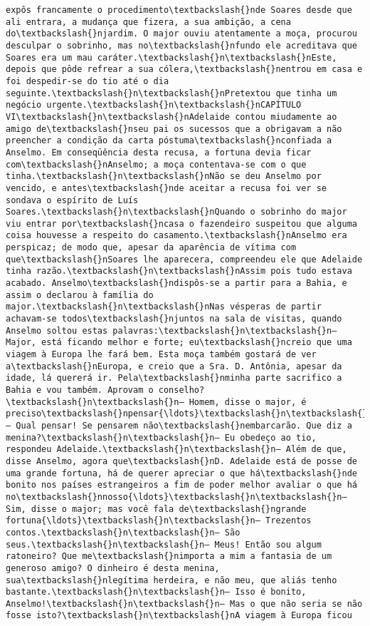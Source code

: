 \documentclass[11pt]{article}
\begin{document}
\begin{Verbatim}[commandchars=\\\{\}]
expôs francamente o procedimento\textbackslash{}nde Soares desde que ali entrara, a mudança que fizera, a sua ambição, a cena do\textbackslash{}njardim. O major ouviu atentamente a moça, procurou desculpar o sobrinho, mas no\textbackslash{}nfundo ele acreditava que Soares era um mau caráter.\textbackslash{}n\textbackslash{}nEste, depois que pôde refrear a sua cólera,\textbackslash{}nentrou em casa e foi despedir-se do tio até o dia seguinte.\textbackslash{}n\textbackslash{}nPretextou que tinha um negócio urgente.\textbackslash{}n\textbackslash{}nCAPÍTULO VI\textbackslash{}n\textbackslash{}nAdelaide contou miudamente ao amigo de\textbackslash{}nseu pai os sucessos que a obrigavam a não preencher a condição da carta póstuma\textbackslash{}nconfiada a Anselmo. Em conseqüência desta recusa, a fortuna devia ficar com\textbackslash{}nAnselmo; a moça contentava-se com o que tinha.\textbackslash{}n\textbackslash{}nNão se deu Anselmo por vencido, e antes\textbackslash{}nde aceitar a recusa foi ver se sondava o espírito de Luís Soares.\textbackslash{}n\textbackslash{}nQuando o sobrinho do major viu entrar por\textbackslash{}ncasa o fazendeiro suspeitou que alguma coisa houvesse a respeito do casamento.\textbackslash{}nAnselmo era perspicaz; de modo que, apesar da aparência de vítima com que\textbackslash{}nSoares lhe aparecera, compreendeu ele que Adelaide tinha razão.\textbackslash{}n\textbackslash{}nAssim pois tudo estava acabado. Anselmo\textbackslash{}ndispôs-se a partir para a Bahia, e assim o declarou à família do major.\textbackslash{}n\textbackslash{}nNas vésperas de partir achavam-se todos\textbackslash{}njuntos na sala de visitas, quando Anselmo soltou estas palavras:\textbackslash{}n\textbackslash{}n— Major, está ficando melhor e forte; eu\textbackslash{}ncreio que uma viagem à Europa lhe fará bem. Esta moça também gostará de ver a\textbackslash{}nEuropa, e creio que a Sra. D. Antônia, apesar da idade, lá quererá ir. Pela\textbackslash{}nminha parte sacrifico a Bahia e vou também. Aprovam o conselho?\textbackslash{}n\textbackslash{}n— Homem, disse o major, é preciso\textbackslash{}npensar{\ldots}\textbackslash{}n\textbackslash{}n— Qual pensar! Se pensarem não\textbackslash{}nembarcarão. Que diz a menina?\textbackslash{}n\textbackslash{}n— Eu obedeço ao tio, respondeu Adelaide.\textbackslash{}n\textbackslash{}n— Além de que, disse Anselmo, agora que\textbackslash{}nD. Adelaide está de posse de uma grande fortuna, há de querer apreciar o que há\textbackslash{}nde bonito nos países estrangeiros a fim de poder melhor avaliar o que há no\textbackslash{}nnosso{\ldots}\textbackslash{}n\textbackslash{}n— Sim, disse o major; mas você fala de\textbackslash{}ngrande fortuna{\ldots}\textbackslash{}n\textbackslash{}n— Trezentos contos.\textbackslash{}n\textbackslash{}n— São seus.\textbackslash{}n\textbackslash{}n— Meus! Então sou algum ratoneiro? Que me\textbackslash{}nimporta a mim a fantasia de um generoso amigo? O dinheiro é desta menina, sua\textbackslash{}nlegítima herdeira, e não meu, que aliás tenho bastante.\textbackslash{}n\textbackslash{}n— Isso é bonito, Anselmo!\textbackslash{}n\textbackslash{}n— Mas o que não seria se não fosse isto?\textbackslash{}n\textbackslash{}nA viagem à Europa ficou 
\end{Verbatim}
\end{document}
